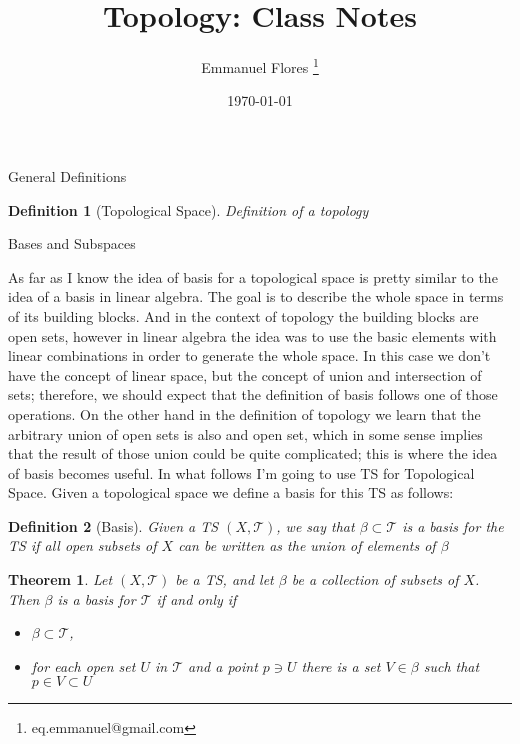 \documentclass[12pt]{article}
\title{Topology: Class Notes}
\author{Emmanuel Flores \thanks{eq.emmanuel@gmail.com}}
\date{\today}
\newtheorem{definition}{Definition}
\newtheorem{theorem}{Theorem}
\begin{document}
\maketitle


\begin{section}{General Definitions}

\begin{tcolorbox}[title=Topological Space]
	\begin{definition}[Topological Space]
	Definition of a topology  
	\end{definition}
\end{tcolorbox}

\end{section}


\begin{section}{Bases and Subspaces}

As far as I know the idea of basis for a topological space is pretty similar to the idea of a basis in linear algebra. The goal is to describe the whole space in terms of its building blocks. And in the context of topology the building blocks are open sets, however in linear algebra the idea was to use the basic elements with linear combinations in order to generate the whole space. In this case we don't have the concept of linear space, but the concept of union and intersection of sets; therefore, we should expect that the definition of basis follows one of those operations.
On the other hand in the definition of topology we learn that the arbitrary union of open sets is also and open set, which in some sense implies that the result of those union could be quite complicated; this is where the idea of basis becomes useful.
In what follows I'm going to use TS for Topological Space. Given a topological space we define a basis for this TS as follows:

\begin{definition}[Basis]
Given a TS $\left( X, \mathcal{T}\right)$, we say that $\mathcal{\beta}\subset\mathcal{T}$ is a basis for the TS if all open subsets of $X$ can be written as the union of elements of $\mathcal{\beta}$
\end{definition}

\begin{theorem}
Let $\left( X, \mathcal{T}\right)$ be a TS, and let $\mathcal{\beta}$ be a collection of subsets of $X$. Then $\mathcal{\beta}$ is a basis for $\mathcal{T}$ if and only if
	\begin{itemize}
		\item $\mathcal{\beta}\subset\mathcal{T}$,
		\item for each open set $U$ in $\mathcal{T}$ and a point $p\ni U$ there is a set $V\in\mathcal{\beta}$ such that $p\in V\subset U$
	\end{itemize}
\end{theorem}


\end{section}
\end{document}
